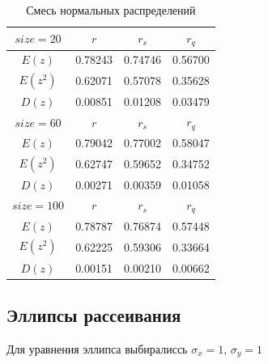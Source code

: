 \begin{table}[H]
	\begin{center}
		\begin{tabular}{|c||c|c|c|}
			\hline
			$size = 20$ & $r$ & $r_s$ & $r_q$ \\ 
			\hline 
			$E(z)$ & 0.78243 & 0.74746 & 0.56700 \\ 
			\hline 
			$E(z^2)$ & 0.62071 & 0.57078 & 0.35628 \\ 
			\hline 
			$D(z)$ & 0.00851 & 0.01208 & 0.03479 \\ 
			\hline \hline 
			$size = 60$ & $r$ & $r_s$ & $r_q$ \\ 
			\hline 
			$E(z)$ & 0.79042 & 0.77002 & 0.58047 \\ 
			\hline 
			$E(z^2)$ & 0.62747 & 0.59652 & 0.34752 \\ 
			\hline 
			$D(z)$ & 0.00271 & 0.00359 & 0.01058 \\ 
			\hline \hline 
			$size = 100$ & $r$ & $r_s$ & $r_q$ \\ 
			\hline 
			$E(z)$ & 0.78787 & 0.76874 & 0.57448 \\ 
			\hline 
			$E(z^2)$ & 0.62225 & 0.59306 & 0.33664 \\ 
			\hline 
			$D(z)$ & 0.00151 & 0.00210 & 0.00662 \\ 
			\hline 
		\end{tabular}
	\end{center}
	\caption{Смесь нормальных распределений}
\end{table} 

\subsection{Эллипсы рассеивания}

Для уравнения эллипса выбиралиссь $\sigma_x = 1$, $\sigma_y = 1$

